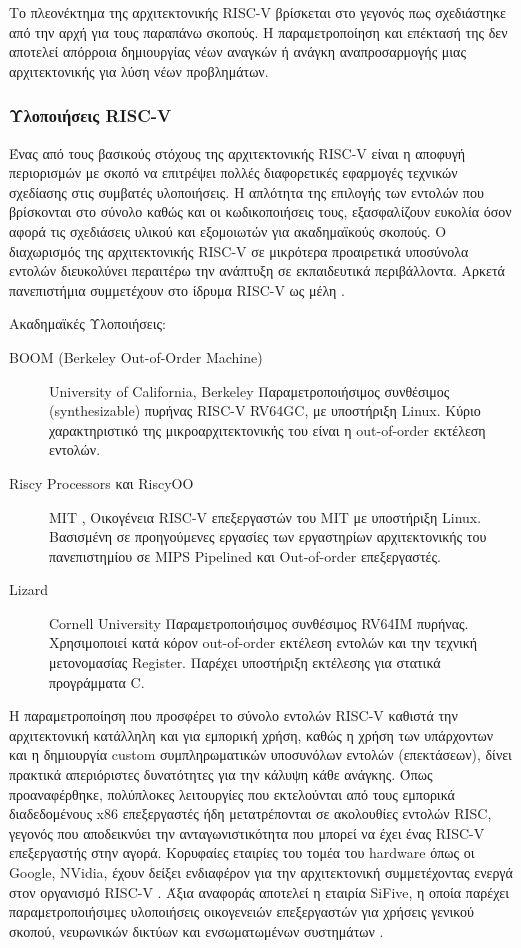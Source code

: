 \documentclass[11pt]{extarticle}
\begin{document}
Το πλεονέκτημα της αρχιτεκτονικής RISC-V βρίσκεται στο γεγονός πως σχεδιάστηκε από την αρχή για τους παραπάνω σκοπούς. 
Η παραμετροποίηση και επέκτασή της δεν αποτελεί απόρροια δημιουργίας νέων αναγκών ή ανάγκη αναπροσαρμογής μιας αρχιτεκτονικής για λύση νέων προβλημάτων. 
\subsubsection{Υλοποιήσεις RISC-V}
Ένας από τους βασικούς στόχους της αρχιτεκτονικής RISC-V είναι η αποφυγή περιορισμών με σκοπό να επιτρέψει πολλές διαφορετικές εφαρμογές τεχνικών σχεδίασης στις συμβατές υλοποιήσεις.
Η απλότητα της επιλογής των εντολών που βρίσκονται στο σύνολο καθώς και οι κωδικοποιήσεις τους, εξασφαλίζουν ευκολία όσον αφορά τις σχεδιάσεις υλικού και εξομοιωτών για ακαδημαϊκούς σκοπούς. 
Ο διαχωρισμός της αρχιτεκτονικής RISC-V σε μικρότερα προαιρετικά υποσύνολα εντολών διευκολύνει περαιτέρω την ανάπτυξη σε εκπαιδευτικά περιβάλλοντα.
Αρκετά πανεπιστήμια συμμετέχουν στο ίδρυμα RISC-V ως μέλη \cite{rvmember}.
\newline

Ακαδημαϊκές Υλοποιήσεις:
\begin{description}
    \item [BOOM (Berkeley Out-of-Order Machine)] University of California, Berkeley \cite{boom} \newline
    Παραμετροποιήσιμος συνθέσιμος (synthesizable) πυρήνας RISC-V RV64GC, με υποστήριξη Linux.
    Κύριο χαρακτηριστικό της μικροαρχιτεκτονικής του είναι η out-of-order εκτέλεση εντολών.
    \item [Riscy Processors και RiscyOO] MIT \cite{riscy}, \cite{riscyooo} \newline
    Οικογένεια RISC-V επεξεργαστών του MIT με υποστήριξη Linux.
    Βασισμένη σε προηγούμενες εργασίες των εργαστηρίων αρχιτεκτονικής του πανεπιστημίου σε MIPS Pipelined και Out-of-order επεξεργαστές.
    \item [Lizard] Cornell University \cite{lizard} \newline
    Παραμετροποιήσιμος συνθέσιμος RV64IM πυρήνας.
    Χρησιμοποιεί κατά κόρον out-of-order εκτέλεση εντολών και την τεχνική μετονομασίας Register.
    Παρέχει υποστήριξη εκτέλεσης για στατικά προγράμματα C.
\end{description}

\newpage
Η παραμετροποίηση που προσφέρει το σύνολο εντολών RISC-V καθιστά την αρχιτεκτονική κατάλληλη και για εμπορική χρήση, καθώς η χρήση των υπάρχοντων και η δημιουργία custom συμπληρωματικών υποσυνόλων εντολών (επεκτάσεων), δίνει πρακτικά απεριόριστες δυνατότητες για την κάλυψη κάθε ανάγκης.
Όπως προαναφέρθηκε, πολύπλοκες λειτουργίες που εκτελούνται από τους εμπορικά διαδεδομένους x86 επεξεργαστές ήδη μετατρέπονται σε ακολουθίες εντολών RISC, γεγονός που αποδεικνύει την ανταγωνιστικότητα που μπορεί να έχει ένας RISC-V επεξεργαστής στην αγορά. 
Κορυφαίες εταιρίες του τομέα του hardware όπως οι Google, NVidia, έχουν δείξει ενδιαφέρον για την αρχιτεκτονική συμμετέχοντας ενεργά στον οργανισμό RISC-V \cite{rvmember}.
Άξια αναφοράς αποτελεί η εταιρία SiFive, η οποία παρέχει παραμετροποιήσιμες υλοποιήσεις οικογενειών επεξεργαστών για χρήσεις γενικού σκοπού, νευρωνικών δικτύων και ενσωματωμένων συστημάτων \cite{sifive}.
\end{document}
